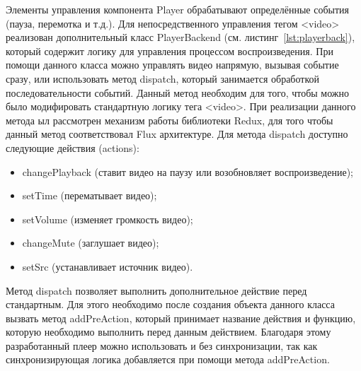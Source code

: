 Элементы управления компонента Player обрабатывают определённые события (пауза, перемотка и т.д.). 
Для непосредственного управления тегом <video> реализован дополнительный класс PlayerBackend (см. листинг~\ref{lst:playerback}), который содержит логику для управления процессом воспроизведения. При помощи данного класса можно управлять видео напрямую, вызывая событие сразу, или использовать метод dispatch, который занимается обработкой последовательности событий.
Данный метод необходим для того, чтобы можно было модифировать стандартную логику тега <video>.
При реализации данного метода ыл рассмотрен механизм работы библиотеки Redux, для того чтобы данный метод соответствовал Flux архитектуре.
Для метода dispatch доступно следующие действия (actions): 
\begin{itemize}
    \item changePlayback (ставит видео на паузу или возобновляет воспроизведение);
    \item setTime (перематывает видео);
    \item setVolume (изменяет громкость видео);
    \item changeMute (заглушает видео);
    \item setSrc (устанавливает источник видео).
\end{itemize}

Метод dispatch позволяет выполнить дополнительное действие перед стандартным. Для этого необходимо после создания объекта данного класса вызвать метод addPreAction, который принимает название действия и функцию, которую необходимо выполнить перед данным действием. Благодаря этому разработанный плеер можно использовать и без синхронизации, так как синхронизирующая логика добавляется при помощи метода addPreAction.

